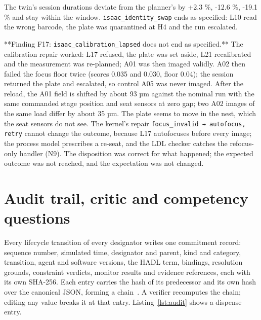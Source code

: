 \documentclass[10pt,a4paper]{article}
\begin{document}
The twin's session durations deviate from the planner's by +2.3 \%, -12.6 \%, -19.1 \% and stay within the window. \texttt{isaac\_\allowbreak{}identity\_\allowbreak{}swap} ends as specified: L10 read the wrong barcode, the plate was quarantined at H4 and the run escalated.

**Finding F17: \texttt{isaac\_\allowbreak{}calibration\_\allowbreak{}lapsed} does not end as specified.** The calibration repair worked: L17 refused, the plate was set aside, L21 recalibrated and the measurement was re-planned; A01 was then imaged validly. A02 then failed the focus floor twice (scores 0.035 and 0.030, floor 0.04); the session returned the plate and escalated, so control A05 was never imaged. After the reload, the A01 field is shifted by about 93 µm against the nominal run with the same commanded stage position and seat sensors at zero gap; two A02 images of the same load differ by about 35 µm. The plate seems to move in the nest, which the seat sensors do not see. The kernel's repair \texttt{focus\_\allowbreak{}invalid → autofocus, retry} cannot change the outcome, because L17 autofocuses before every image; the process model prescribes a re-seat, and the LDL checker catches the refocus-only handler (N9). The disposition was correct for what happened; the expected outcome was not reached, and the expectation was not changed.

\section{Audit trail, critic and competency questions}\label{sec:audit}

Every lifecycle transition of every designator writes one commitment record: sequence number, simulated time, designator and parent, kind and category, transition, agent and software versions, the HADL term, bindings, resolution grounds, constraint verdicts, monitor results and evidence references, each with its own SHA-256. Each entry carries the hash of its predecessor and its own hash over the canonical JSON, forming a chain~\citep{haber1991}. A verifier recomputes the chain; editing any value breaks it at that entry. Listing~\ref{lst:audit} shows a dispense entry.
\end{document}
